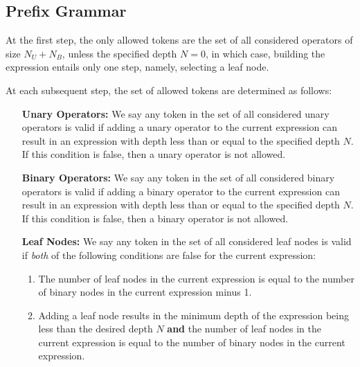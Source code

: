 \documentclass[runningheads]{llncs}
\begin{document}
\subsection{Prefix Grammar}\label{subsec:prefix_grammar}
At the first step, the only allowed tokens are the set of all considered operators of size $N_U + N_B$, unless the specified depth $N=0$, in which case, building the expression entails only one step, namely, selecting a leaf node.
\par At each subsequent step, the set of allowed tokens are determined as follows:
\begin{itemize}
    \item[\textbf{Unary Operators:}]
    We say any token in the set of all considered unary operators is valid if adding a unary operator to the current expression can result in an expression with depth less than or equal to the specified depth $N$. If this condition is false, then a unary operator is not allowed.
    \item[\textbf{Binary Operators:}]
    We say any token in the set of all considered binary operators is valid if adding a binary operator to the current expression can result in an expression with depth less than or equal to the specified depth $N$. If this condition is false, then a binary operator is not allowed.
    \item[\textbf{Leaf Nodes:}]
    We say any token in the set of all considered leaf nodes is valid if \emph{both} of the following conditions are false for the current expression:
    \begin{enumerate}
    \item The number of leaf nodes in the current expression is equal to the number of binary nodes in the current expression minus 1.
    \item Adding a leaf node results in the minimum depth of the expression being less than the desired depth $N$ \textbf{and} the number of leaf nodes in the current expression is equal to the number of binary nodes in the current expression.
\end{enumerate}
\end{itemize}
\end{document}
